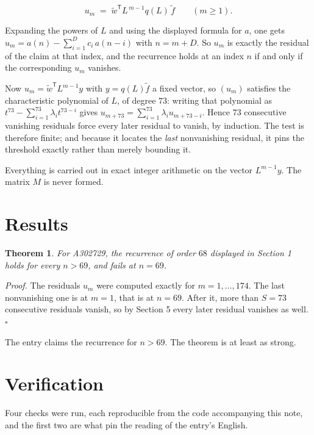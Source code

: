 \documentclass[11pt]{article}
\newtheorem{theorem}{Theorem}
\theoremstyle{definition}
\begin{document}
\[u_m \;=\; \tilde w^{\mathsf T} L^{\,m-1} q(L)\,\tilde f \qquad (m \ge 1).\]

Expanding the powers of $L$ and using the displayed formula for $a$, one gets $u_m = a(n) - \sum_{i=1}^{D} c_i\,a(n-i)$ with $n = m + D$. So $u_m$ is exactly the residual of the claim at that index, and the recurrence holds at an index $n$ if and only if the corresponding $u_m$ vanishes.

Now $u_m = \tilde w^{\mathsf T} L^{m-1} y$ with $y = q(L)\tilde f$ a fixed vector, so $(u_m)$ satisfies the characteristic polynomial of $L$, of degree $73$: writing that polynomial as $t^{73} - \sum_{i=1}^{73} \lambda_i t^{73-i}$ gives $u_{m+73} = \sum_{i=1}^{73} \lambda_i u_{m+73-i}$. Hence $73$ consecutive vanishing residuals force every later residual to vanish, by induction. The test is therefore finite; and because it locates the {\itshape last} nonvanishing residual, it pins the threshold exactly rather than merely bounding it.

Everything is carried out in exact integer arithmetic on the vector $L^{m-1}y$. The matrix $M$ is never formed.

\section{Results}

\begin{theorem} For A302729, the recurrence of order $68$ displayed in Section 1 holds for every $n > 69$, and fails at $n = 69$.\end{theorem}

{\itshape Proof.} The residuals $u_m$ were computed exactly for $m = 1,\dots,174$. The last nonvanishing one is at $m = 1$, that is at $n = 69$. After it, more than $S = 73$ consecutive residuals vanish, so by Section 5 every later residual vanishes as well. $\square$

The entry claims the recurrence for $n > 69$. The theorem is at least as strong.

\section{Verification}

Four checks were run, each reproducible from the code accompanying this note, and the first two are what pin the reading of the entry's English.
\end{document}
